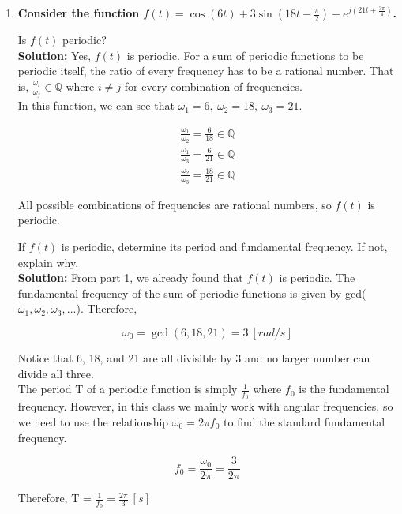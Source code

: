 \documentclass[12pt,letterpaper, onecolumn]{exam}
\begin{document}
\begin{enumerate}
\begin{questions}
\end{questions}

\item \textbf{Consider the function $f(t) = \cos{(6t)} + 3\sin{(18t-\frac{\pi}{2})} - e^{j(21t + \frac{3\pi}{4})}$.}

\begin{questions} 
\question Is $f(t)$ periodic? \\

\textbf{Solution: } Yes, $f(t)$ is periodic. For a sum of periodic functions to be periodic itself, the ratio of every frequency has to be a rational number. That is, $\frac{\omega_i}{\omega_j} \in \mathbb{Q}$ where $i \neq j$ for every combination of frequencies. \\

In this function, we can see that $\omega_1 = 6,\ \omega_2 = 18,\ \omega_3 = 21$. 

\begin{align*}
    \frac{\omega_1}{\omega_2} = \frac{6}{18} \in \mathbb{Q} \\
    \frac{\omega_1}{\omega_3} = \frac{6}{21} \in \mathbb{Q} \\
    \frac{\omega_2}{\omega_3} = \frac{18}{21} \in \mathbb{Q}
\end{align*}

All possible combinations of frequencies are rational numbers, so $f(t)$ is periodic.

\newpage

\question If $f(t)$ is periodic, determine its period and fundamental frequency. If not, explain why. \\

\textbf{Solution: } From part 1, we already found that $f(t)$ is periodic. The fundamental frequency of the sum of periodic functions is given by gcd($\omega_1,\omega_2,\omega_3,...$). Therefore,

\[
\omega_0 = \gcd(6,18,21) = \boxed{3\ [rad/s]}
\]

Notice that 6, 18, and 21 are all divisible by 3 and no larger number can divide all three. \\

The period T of a periodic function is simply $\frac{1}{f_0}$ where $f_0$ is the fundamental frequency. However, in this class we mainly work with angular frequencies, so we need to use the relationship $\omega_0 = 2\pi f_0$ to find the standard fundamental frequency. 

\[
f_0 = \frac{\omega_0}{2\pi} = \frac{3}{2\pi}
\]

Therefore, T = $\frac{1}{f_0} = \boxed{\frac{2\pi}{3}\ [s]}$

\end{questions}

\end{enumerate}
\end{document}
